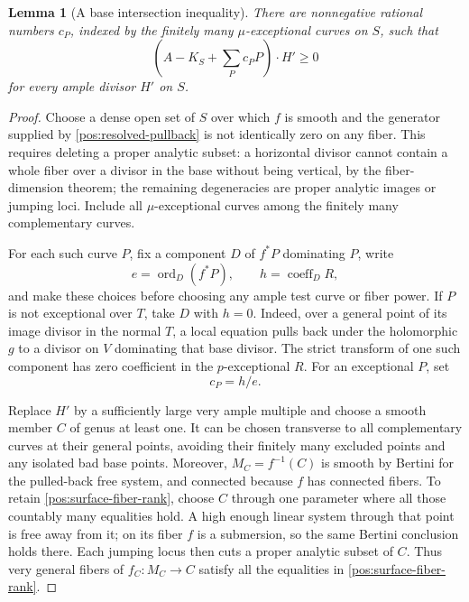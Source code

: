 \documentclass[11pt,letterpaper]{article}
\newtheorem{lemma}[theorem]{Lemma}
\theoremstyle{definition}
\theoremstyle{remark}
\begin{document}
\begin{lemma}[A base intersection inequality]\label{pos:surface-inequality}
There are nonnegative rational numbers \(c_P\), indexed by the
finitely many \(\mu\)-exceptional curves on \(S\), such that
\begin{equation}\label{pos:surface-intersection}
 \left(A-K_S+\sum_Pc_PP\right)\cdot H'\geq0
\end{equation}
for every ample divisor \(H'\) on \(S\).
\end{lemma}

\begin{proof}
Choose a dense open set of \(S\) over which \(f\) is smooth and the
generator supplied by \eqref{pos:resolved-pullback} is not identically
zero on any fiber. This requires deleting a proper analytic subset:
a horizontal divisor cannot contain a whole fiber over a divisor in
the base without being vertical, by the fiber-dimension theorem; the
remaining degeneracies are proper analytic images or jumping loci.
Include all \(\mu\)-exceptional curves among the finitely many
complementary curves.

For each such curve \(P\), fix a component \(D\) of \(f^*P\)
dominating \(P\), write
\[
 e=\operatorname{ord}_D(f^*P),\qquad h=\operatorname{coeff}_D R,
\]
and make these choices before choosing any ample test curve or fiber
power. If \(P\) is not exceptional over \(T\), take \(D\) with
\(h=0\). Indeed, over a general point of its image divisor in the
normal \(T\), a local equation pulls back under the holomorphic
\(g\) to a divisor on \(V\) dominating that base divisor. The strict
transform of one such component has zero coefficient in the
\(p\)-exceptional \(R\). For an exceptional \(P\), set
\begin{equation}\label{pos:exceptional-pole-allowance}
 c_P=h/e.
\end{equation}

Replace \(H'\) by a sufficiently large very ample multiple and choose
a smooth member \(C\) of genus at least one. It can be chosen
transverse to all complementary curves at their general points,
avoiding their finitely many excluded points and any isolated bad
base points. Moreover, \(M_C=f^{-1}(C)\) is smooth by Bertini for
the pulled-back free system, and connected because \(f\) has connected
fibers. To retain \eqref{pos:surface-fiber-rank}, choose \(C\) through
one parameter where all those countably many equalities hold. A high
enough linear system through that point is free away from it; on its
fiber \(f\) is a submersion, so the same Bertini conclusion holds
there. Each jumping locus then cuts a proper analytic subset of
\(C\). Thus very general fibers of \(f_C:M_C\to C\) satisfy all
the equalities in \eqref{pos:surface-fiber-rank}.


\end{proof}
\end{document}
